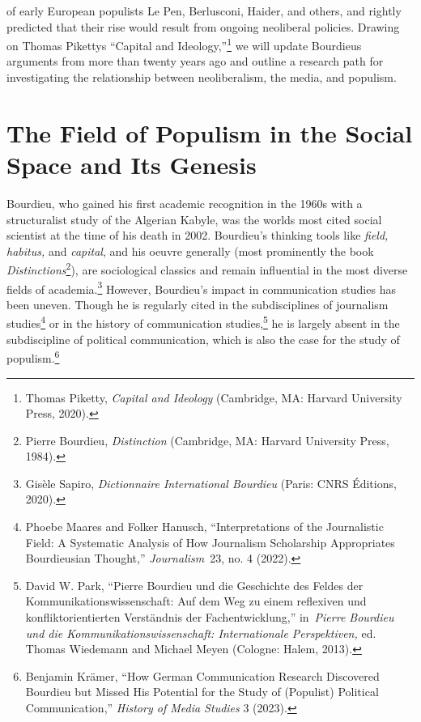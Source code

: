 \documentclass{tufte-handout}
\begin{document}
of early European populists Le Pen, Berlusconi, Haider, and others, and
rightly predicted that their rise would result from ongoing neoliberal
policies. Drawing on Thomas Piketty\textquotesingle s ``Capital and
Ideology,''\footnote{Thomas Piketty, \emph{Capital and Ideology}
  (Cambridge, MA: Harvard University Press, 2020).} we will update
Bourdieu\textquotesingle s arguments from more than twenty years ago and
outline a research path for investigating the relationship between
neoliberalism, the media, and populism.

\hypertarget{the-field-of-populism-in-the-social-space-and-its-genesis}{%
\section{The Field of Populism in the Social Space and Its
Genesis}\label{the-field-of-populism-in-the-social-space-and-its-genesis}}

Bourdieu, who gained his first academic recognition in the 1960s with a
structuralist study of the Algerian Kabyle, was the
world\textquotesingle s most cited social scientist at the time of his
death in 2002. Bourdieu's thinking tools like \emph{field, habitus,} and
\emph{capital}, and his oeuvre generally (most prominently the book
\emph{Distinctions}\footnote{Pierre Bourdieu, \emph{Distinction}
  (Cambridge, MA: Harvard University Press, 1984).}), are sociological
classics and remain influential in the most diverse fields of
academia.\footnote{Gisèle Sapiro, \emph{Dictionnaire International
  Bourdieu} (Paris: CNRS Éditions, 2020).} However, Bourdieu's impact in
communication studies has been uneven. Though he is regularly cited in
the subdisciplines of journalism studies\footnote{Phoebe Maares and
  Folker Hanusch, ``Interpretations of the Journalistic Field: A
  Systematic Analysis of How Journalism Scholarship Appropriates
  Bourdieusian Thought,'' \emph{Journalism}~23, no. 4 (2022).} or in the
history of communication studies,\footnote{David W. Park, ``Pierre
  Bourdieu und die Geschichte des Feldes der Kommunikationswissenschaft:
  Auf dem Weg zu einem reflexiven und konfliktorientierten Verständnis
  der Fachentwicklung,'' in~\emph{Pierre Bourdieu und die
  Kommunikationswissenschaft: Internationale Perspektiven,} ed. Thomas
  Wiedemann and Michael Meyen (Cologne: Halem, 2013).} he is largely
absent in the subdiscipline of political communication, which is also
the case for the study of populism.\footnote{Benjamin Krämer, ``How
  German Communication Research Discovered Bourdieu but Missed His
  Potential for the Study of (Populist) Political Communication,''
  \emph{History of Media Studies} 3 (2023).}
\end{document}
